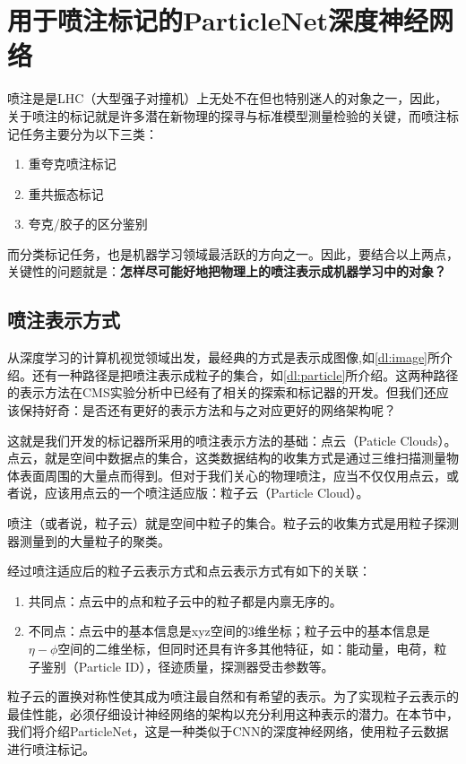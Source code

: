 \chapter{用于喷注标记的ParticleNet深度神经网络}
\label{chap4}
\fontsize{12bp}{14.4pt}

喷注是是LHC（大型强子对撞机）上无处不在但也特别迷人的对象之一，因此，关于喷注的标记就是许多潜在新物理的探寻与标准模型测量检验的关键，而喷注标记任务主要分为以下三类：
\begin{enumerate}[1.]
    \item 重夸克喷注标记
    \item 重共振态标记
    \item 夸克/胶子的区分鉴别
\end{enumerate}
\cdots

而分类标记任务，也是机器学习领域最活跃的方向之一。因此，要结合以上两点，关键性的问题就是：\textbf{怎样尽可能好地把物理上的喷注表示成机器学习中的对象？}
\section{喷注表示方式}
从深度学习的计算机视觉领域出发，最经典的方式是表示成图像,如\ref{dl:image}所介绍。还有一种路径是把喷注表示成粒子的集合，如\ref{dl:particle}所介绍。这两种路径的表示方法在CMS实验分析中已经有了相关的探索和标记器的开发。但我们还应该保持好奇：是否还有更好的表示方法和与之对应更好的网络架构呢？

这就是我们开发的标记器所采用的喷注表示方法的基础：点云（Paticle Clouds）。点云，就是空间中数据点的集合，这类数据结构的收集方式是通过三维扫描测量物体表面周围的大量点而得到。但对于我们关心的物理喷注，应当不仅仅用点云，或者说，应该用点云的一个喷注适应版：粒子云（Particle Cloud）。

喷注（或者说，粒子云）就是空间中粒子的集合。粒子云的收集方式是用粒子探测器测量到的大量粒子的聚类。

经过喷注适应后的粒子云表示方式和点云表示方式有如下的关联：
\begin{enumerate}[$\mathrm{\cdot}$]
    \item 共同点：点云中的点和粒子云中的粒子都是内禀无序的。
    \item 不同点：点云中的基本信息是xyz空间的3维坐标；粒子云中的基本信息是$\eta-\phi$空间的二维坐标，但同时还具有许多其他特征，如：能动量，电荷，粒子鉴别（Particle ID），径迹质量，探测器受击参数等。
\end{enumerate}
粒子云的置换对称性使其成为喷注最自然和有希望的表示。为了实现粒子云表示的最佳性能，必须仔细设计神经网络的架构以充分利用这种表示的潜力。在本节中，我们将介绍ParticleNet，这是一种类似于CNN的深度神经网络，使用粒子云数据进行喷注标记。
